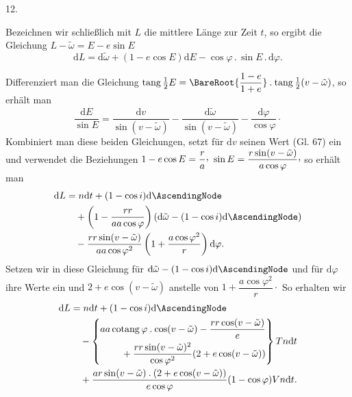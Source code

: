 \par{}\bigskip
{}
\begin{center}12.\end{center}
\noindent\hspace*{\parindent}Bezeichnen wir schließlich mit \(L\) die mittlere Länge zur Zeit \(t\), so ergibt die Gleichung \(L-\tilde\omega=E-e\sin E\)
\[
\mathrm{d}L=\mathrm{d}\tilde\omega+(1-e\cos E)\mathrm{d}E-\cos\varphi\mathbin{.}\sin E\mathbin{.}\mathrm{d}\varphi.
\]
\par Differenziert man die Gleichung \(\operatorname{tang}\tfrac12E=\BareRoot{\dfrac{1-e}{1+e}}\mathbin{.}\operatorname{tang}\tfrac12(v-\tilde\omega)\), so erhält man
\[
\dfrac{\mathrm{d}E}{\sin E}=\dfrac{\mathrm{d}v}{\sin(v-\tilde\omega)}-\dfrac{\mathrm{d}\tilde\omega}{\sin(v-\tilde\omega)}-\dfrac{\mathrm{d}\varphi}{\cos\varphi}\mathpunct{\cdot}
\]
Kombiniert man diese beiden Gleichungen, setzt für \(\mathrm{d}v\) seinen Wert (Gl. 67) ein und verwendet die Beziehungen \(1-e\cos E=\dfrac{r}{a}\mathpunct{\raisebox{.45ex}{,}}\) \(\sin E=\dfrac{r\sin(v-\tilde\omega)}{a\cos\varphi}\mathpunct{\raisebox{.45ex}{,}}\) so erhält man
\[
\begin{aligned}
\mathrm{d}L&=n\mathrm{d}t+(1-\cos i)\mathrm{d}\AscendingNode\\
&\quad+\left(1-\dfrac{rr}{aa\cos\varphi}\right)(\mathrm{d}\tilde\omega-(1-\cos i)\mathrm{d}\AscendingNode)\\
&\quad-\dfrac{rr\sin(v-\tilde\omega)}{aa\cos\varphi^2}\left(1+\dfrac{a\cos\varphi^2}{r}\right)\mathrm{d}\varphi.
\end{aligned}
\]
Setzen wir in diese Gleichung für \(\mathrm{d}\tilde\omega-(1-\cos i)\mathrm{d}\AscendingNode\) und für \(\mathrm{d}\varphi\) ihre Werte ein und \(2+e\cos(v-\tilde\omega)\) anstelle von \(1+\dfrac{a\cos\varphi^2}{r}\mathpunct{\cdot}\) So erhalten wir
\[
\begin{aligned}
\mathrm{d}L&=n\mathrm{d}t+(1-\cos i)\mathrm{d}\AscendingNode\\
&\quad-\left\{\begin{aligned}aa\operatorname{cotang}\varphi\mathbin{.}\cos(v-\tilde\omega)-\dfrac{rr\cos(v-\tilde\omega)}{e}\\
{}+\dfrac{rr\sin(v-\tilde\omega)^2}{\cos\varphi^2}(2+e\cos(v-\tilde\omega))\end{aligned}\right\}Tn\mathrm{d}t\\
&\quad+\dfrac{ar\sin(v-\tilde\omega)\mathbin{.}(2+e\cos(v-\tilde\omega))}{e\cos\varphi}(1-\cos\varphi)Vn\mathrm{d}t.
\end{aligned}
\]
